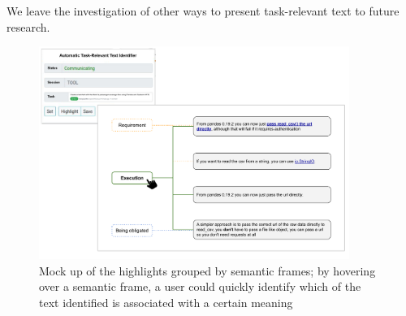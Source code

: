 We leave the investigation of other ways to present task-relevant text to future research.




\begin{figure}
    \centering
    \includegraphics[width=0.90\textwidth]{fig/cp7/semantic-cues}
    \caption{Mock up of the highlights grouped by semantic frames; by hovering over a semantic frame, a user could quickly identify which of the text identified is associated with a certain meaning}
    \label{fig:semantic-cues}
\end{figure}






